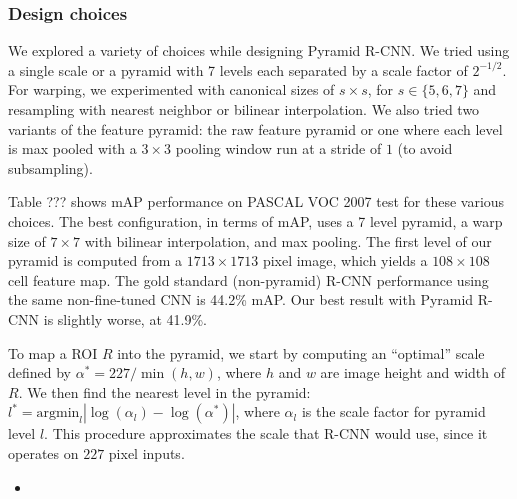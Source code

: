 \subsubsection{Design choices}

We explored a variety of choices while designing Pyramid R-CNN.
We tried using a single scale or a pyramid with 7 levels each separated by a scale factor of $2^{-1/2}$.
For warping, we experimented with canonical sizes of $s \times s$, for $s \in \{5,6,7\}$ and resampling with nearest neighbor or bilinear interpolation.
We also tried two variants of the feature pyramid: the raw feature pyramid or one where each level is max pooled with a $3 \times 3$ pooling window run at a stride of $1$ (to avoid subsampling).

Table ??? shows mAP performance on PASCAL VOC 2007 test for these various choices.
The best configuration, in terms of mAP, uses a 7 level pyramid, a warp size of $7 \times 7$ with bilinear interpolation, and max pooling.
The first level of our pyramid is computed from a $1713 \times 1713$ pixel image, which yields a $108 \times 108$ cell feature map.
The gold standard (non-pyramid) R-CNN performance using the same non-fine-tuned CNN is 44.2\% mAP.
Our best result with Pyramid R-CNN is slightly worse, at 41.9\%.

To map a ROI $R$ into the pyramid, we start by computing an ``optimal'' scale defined by $\alpha^* = 227/\min(h,w)$, where $h$ and $w$ are image height and width of $R$.
We then find the nearest level in the pyramid: $l^* = \textrm{argmin}_l |\log(\alpha_l) - \log(\alpha^*)|$, where $\alpha_l$ is the scale factor for pyramid level $l$.
This procedure approximates the scale that R-CNN would use, since it operates on $227$ pixel inputs.


\begin{itemize}
\itemsep1pt\parskip0pt
\item
\end{itemize}


